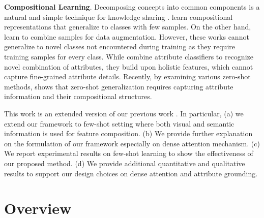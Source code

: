 \documentclass[10pt,journal,compsoc]{IEEEtran}
\newcommand{\1}{\boldsymbol{1}}
\newcommand{\0}{\boldsymbol{0}}
\newcommand{\<}{\langle}
\renewcommand{\>}{\rangle}
\newcommand{\myparagraph}[1]{\vspace{-2pt}\medskip\noindent\textbf{#1}}
\begin{document}
\myparagraph{Compositional Learning}. Decomposing concepts into common components is a natural and simple technique for knowledge sharing \cite{Lake:Science15,Lampert:PAMI13,Farhadi:CVPR09,Russakovsky:ECCVW10}.
\cite{Tokmakov:ICCV19,Andreas:ICLR19} learn compositional representations that generalize to classes with few samples. On the other hand, \cite{Chen:CVPR19ImgDeform,Zhang:ICLR18} learn to combine samples for data augmentation. However, these works cannot generalize to novel classes not encountered during training as they require training samples for every class. While \cite{Misra:CVPR17,Kato:ECCV18,Purushwalkam:ICCV19,Yang:CVPR20,Atzmon:NeurIPS20} combine attribute classifiers to recognize novel combination of attributes, they build upon holistic features, which cannot capture fine-grained attribute details. Recently, by examining various zero-shot methods, \cite{Sylvain:ICLR20} shows that zero-shot generalization requires capturing attribute information and their compositional structures.

\myparagraph{}
This work is an extended version of our previous work \cite{Huynh:NeurIPS20,Huynh-finegrained:CVPR20}. In particular, (a) we extend our framework to few-shot setting where both visual and semantic information is used for feature composition. (b) We provide further explanation on the formulation of our framework especially on dense attention mechanism. (c) We report experimental results on few-shot learning to show the effectiveness of our proposed method. (d) We provide additional quantitative and qualitative results to support our design choices on dense attention and attribute grounding.

\section{Overview}
\label{sec:overview}
\end{document}
